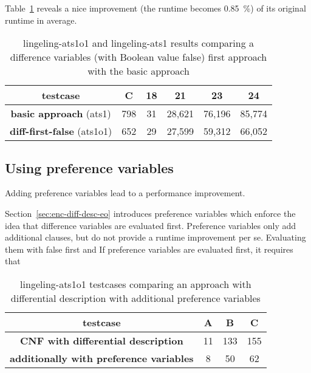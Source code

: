 Table~\ref{tab:diff-first-false-results} reveals a nice improvement (the runtime
becomes 0.85~\%) of its original runtime in average.

\begin{table}[!h]
  \begin{center}
    \begin{tabular}{c|c|cccc}
      \textbf{testcase}                   & \textbf{C} & \textbf{18} & \textbf{21} & \textbf{23} & \textbf{24} \\
    \hline
      \textbf{basic approach}      (ats1) &        798 &          31 &      28,621 &      76,196 &      85,774 \\
      \textbf{diff-first-false}  (ats1o1) &        652 &          29 &      27,599 &      59,312 &      66,052
    \end{tabular}
    \caption[Difference variables first (with Boolean value false) results]{
      lingeling-ats1o1 and lingeling-ats1 results
      comparing a difference variables (with Boolean value false) first approach
      with the basic approach
    }
    \label{tab:diff-first-false-results}
  \end{center}
\end{table}

\subsection{Using preference variables}
\label{sec:preference-variables}
%
\begin{prop}
  Adding preference variables lead to a performance improvement.
\end{prop}
%
Section~\ref{sec:enc-diff-desc-eo} introduces preference variables
which enforce the idea that difference variables are evaluated first.
Preference variables only add additional clauses, but do not provide
a runtime improvement per se. Evaluating them with false first
and 
If preference variables are evaluated first, it requires that



\begin{table}[!h]
  \begin{center}
    \begin{tabular}{c|ccc}
      \textbf{testcase}                                & \textbf{A} &  \textbf{B} &  \textbf{C} \\
    \hline
      \textbf{CNF with differential description}       &         11 &         133 &       155 \\
      \textbf{additionally with preference variables}  &          8 &          50 &        62 \\
    \end{tabular}
    \caption{
      lingeling-ats1o1 testcases comparing an approach
      with differential description with additional preference variables
    }
    \label{tab:pref-vars-results}
  \end{center}
\end{table}


